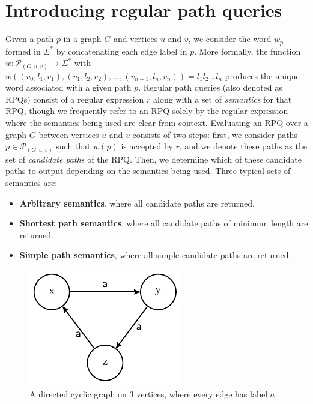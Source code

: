 \documentclass{article}
\begin{document}
\section{Introducing regular path queries}
\label{sec:intro_rpqs}

Given a path $p$ in a graph $G$ and vertices $u$ and $v$, we consider the word $w_p$ formed in $\Sigma^*$ by concatenating each edge label in $p$. More formally, the function $w: \mathcal{P}_{(G,u,v)} \rightarrow \Sigma^*$ with $w \left((v_0, l_1, v_1), (v_1, l_2, v_2), \dots, (v_{n-1}, l_n, v_n) \right) = l_1 l_2 \dots l_n$ produces the unique word associated with a given path $p$. Regular path queries (also denoted as RPQs) consist of a regular expression $r$ along with a set of \emph{semantics} for that RPQ, though we frequently refer to an RPQ solely by the regular expression where the semantics being used are clear from context. Evaluating an RPQ over a graph $G$ between vertices $u$ and $v$ consists of two steps: first, we consider paths $p \in \mathcal{P}_{(G,u,v)}$ such that $w(p)$ is accepted by $r$, and we denote these paths as the set of \emph{candidate paths} of the RPQ. Then, we determine which of these candidate paths to output depending on the semantics being used. Three typical sets of semantics are:

\begin{itemize}
    \item \textbf{Arbitrary semantics}, where all candidate paths are returned.
    \item \textbf{Shortest path semantics}, where all candidate paths of minimum length are returned.
    \item \textbf{Simple path semantics}, where all simple candidate paths are returned.
\end{itemize}

\begin{figure}
    \label{fig:arbitrary_infinite}
    \centering
    
    \includegraphics{figures/arbitrary_infinite.pdf}
    \caption{A directed cyclic graph on $3$ vertices, where every edge has label $a$.}
\end{figure}
\end{document}
